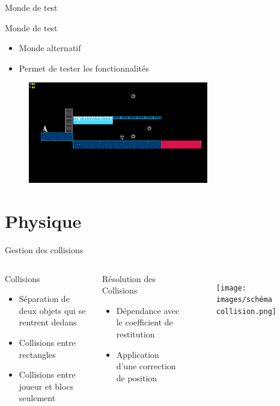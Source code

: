 \documentclass{beamer}
\begin{document}
{\begin{frame}{Monde de test}
    \begin{block}{Monde de test}
        \begin{itemize}
            \item[\bullet] Monde alternatif
            \item[\bullet] Permet de tester les fonctionnalités
        \end{itemize}
    \end{block}
    \begin{figure}
        \centering
        \includegraphics[width=0.7\textwidth]{test_world}
    \end{figure}
\end{frame}

\section{Physique}
\begin{frame}{Gestion des collisions}
    \begin{columns}
        \begin{block}{Collisions}
            \begin{itemize}
                \item[\bullet] Séparation de deux objets qui se rentrent dedans
                \item[\bullet] Collisions entre rectangles
                \item[\bullet] Collisions entre joueur et blocs seulement
            \end{itemize}
        \end{block}
        \begin{block}{Résolution des Collisions}
            \begin{itemize}
                \item[\bullet] Dépendance avec le coefficient de restitution
                \item[\bullet] Application d'une correction de position
            \end{itemize}
        \end{block}
        \begin{figure}
            \centering
            \texttt{[image: images/schéma collision.png]}
        \end{figure}
    \end{columns}
\end{frame}

}
\end{document}
